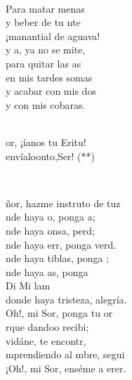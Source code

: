 \documentclass[12pt]{article}
\begin{document}
\begin{multicols*}{2}
\begin{cancion}
\begin{chorus}
	\end{chorus}%
	\jump\\
	Para matar menas\\
	y beber de tu nte\\
	¡manantial de aguava!\\
	y a, ya no se mite, \\
	para quitar las as\\
	en mis tardes somas \\
	y acabar con mis dos\\
	y con mis cobaras.\\\jump\\
	\begin{chorus}%
	or, ¡íanos tu Eritu!   \\
	envíaloonto,Ser! (**)\\
	\end{chorus}%
	\jump\\
\end{cancion}%

\begin{cancion}%
	ñor, hazme instruto de tuz\\
	nde haya o, ponga a;\\
	nde haya onsa, perd;\\
	nde haya err, ponga verd.\\
\jump
	nde haya tiblas, ponga ;\\
	nde haya as, ponga   \\
Di             Mi        lam\\
donde haya tristeza, alegría.\\
	Oh!, mi Sor, ponga tu or\\
\jump
	rque dandoo recibi; \\
	vidáne, te encontr, \\
	mprendiendo al mbre, segui \\
	¡Oh!, mi Sor, enséme a erer. \\
\end{cancion}%


\end{multicols*}
\end{document}
